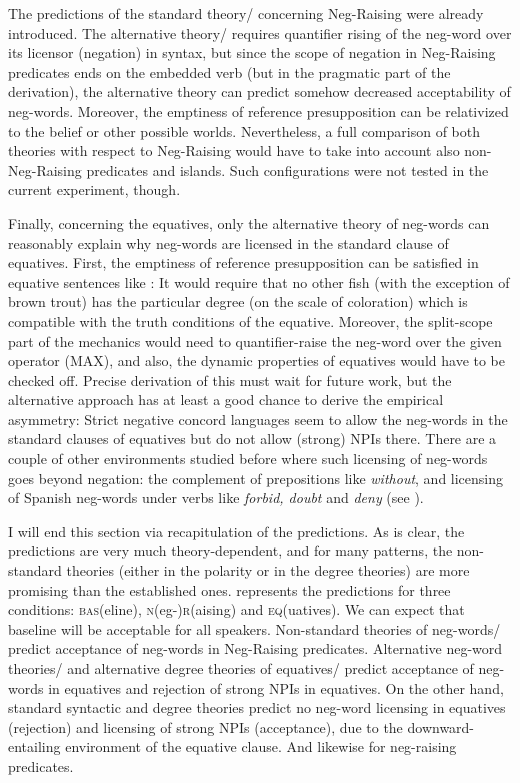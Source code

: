 \documentclass[output=paper,colorlinks,citecolor=brown]{langscibook}
\begin{document}
The predictions of the standard theory/\citet{zeijlstra2004sentential} concerning Neg-Raising were already introduced. The alternative theory/\citet{ovalle2004double} requires quantifier rising of the neg-word over its licensor (negation) in syntax, but since the scope of negation in Neg-Raising predicates ends on the embedded verb (but in the pragmatic part of the derivation), the alternative theory can predict somehow decreased acceptability of neg-words. Moreover, the emptiness of reference presupposition can be relativized to the belief or other possible worlds. Nevertheless, a full comparison of both theories with respect to Neg-Raising would have to take into account also non-Neg-Raising predicates and islands. Such configurations were not tested in the current experiment, though.

Finally, concerning the equatives, only the alternative theory of neg-words can reasonably explain why neg-words are licensed in the standard clause of equatives. First, the emptiness of reference presupposition can be satisfied in equative sentences like : It would require that no other fish (with the exception of brown trout) has the particular degree (on the scale of coloration) which is compatible with the truth conditions of the equative. Moreover, the split-scope part of the mechanics would need to quantifier-raise the neg-word over the given operator (MAX), and also, the dynamic properties of equatives would have to be checked off. Precise derivation of this must wait for future work, but the alternative approach has at least a good chance to derive the empirical asymmetry: Strict negative concord languages seem to allow the neg-words in the standard clauses of equatives but do not allow (strong) NPIs there. There are a couple of other environments studied before where such licensing of neg-words goes beyond negation: the complement of prepositions like \textit{without}, and licensing of Spanish neg-words under verbs like \textit{forbid, doubt} and \textit{deny} (see \cite{herburger2001negative}). 

I will end this section via recapitulation of the predictions. As is clear, the predictions are very much theory-dependent, and for many patterns, the non-standard theories (either in the polarity or in the degree theories) are more promising than the established ones.  represents the predictions for three conditions: \textsc{bas}(eline), \textsc{n}(eg-)\textsc{r}(aising) and \textsc{eq}(uatives). We can expect that baseline will be acceptable for all speakers. Non-standard theories of neg-words/\citet{ovalle2004double} predict acceptance of neg-words in Neg-Raising predicates.  Alternative neg-word theories/\citet{ovalle2004double} and alternative degree theories of equatives/\citet{penka2016degree} predict acceptance of neg-words in equatives and rejection of strong NPIs in equatives. On the other hand, standard syntactic and degree theories predict no neg-word licensing in equatives (rejection) and licensing of strong NPIs (acceptance), due to the downward-entailing environment of the equative clause. And likewise for neg-raising predicates. 
\end{document}
